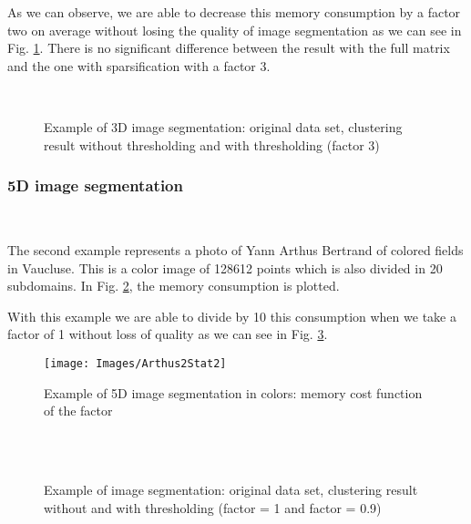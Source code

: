\documentclass{llncs}
\begin{document}
As we can observe, we are able to decrease this memory consumption by a
factor two on average without losing the quality of image segmentation as we
can see in Fig. \ref{benji}. There is no significant difference
between the result with the full matrix and the one with sparsification with a
factor 3.

\begin{figure}[!h]
  \begin{center}
  \begin{center}
  \\
  \end{center}
  \end{center}
  \caption{Example of 3D image segmentation: original data set, clustering result
  without thresholding and with thresholding (factor 3)}
  \label{benji}
 \end{figure}

\subsubsection{5D image segmentation}

\

The second example represents a photo of Yann Arthus Bertrand of colored fields in Vaucluse. %
This is  a color image of 128612 points which is also divided in 20 subdomains. In Fig. \ref{stat}, the memory
consumption is plotted.

With this example we are able to divide by 10 this consumption when we take a
factor of 1 without loss of quality as we can see in Fig. \ref{arthus2}.

\begin{figure}[!h]
  \begin{center}
  {\texttt{[image: Images/Arthus2Stat2]}}
  \end{center}
  \caption{Example of 5D image segmentation in colors: memory cost function of the factor}
  \label{stat}
 \end{figure}

\begin{figure}[!h]
  \begin{center}
  \\
  \\
  \end{center}
  \caption{Example of image segmentation: original data set, clustering result
  without and with thresholding (factor = 1 and factor = 0.9)}
  \label{arthus2}
 \end{figure}
\end{document}
